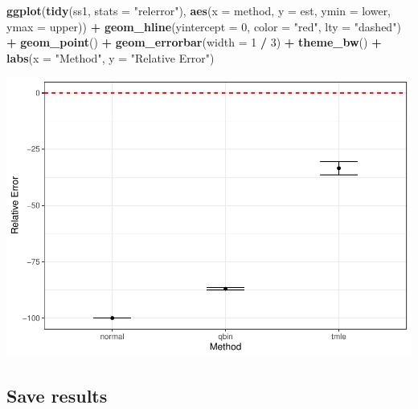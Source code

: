 \documentclass[
]{article}
\newenvironment{Shaded}{\begin{snugshade}}{\end{snugshade}}
\newcommand{\AttributeTok}[1]{\textcolor[rgb]{0.13,0.29,0.53}{#1}}
\newcommand{\DecValTok}[1]{\textcolor[rgb]{0.00,0.00,0.81}{#1}}
\newcommand{\FunctionTok}[1]{\textcolor[rgb]{0.13,0.29,0.53}{\textbf{#1}}}
\newcommand{\NormalTok}[1]{#1}
\newcommand{\SpecialCharTok}[1]{\textcolor[rgb]{0.81,0.36,0.00}{\textbf{#1}}}
\newcommand{\StringTok}[1]{\textcolor[rgb]{0.31,0.60,0.02}{#1}}
\begin{document}
\begin{Shaded}
\begin{Highlighting}[]
\FunctionTok{ggplot}\NormalTok{(}\FunctionTok{tidy}\NormalTok{(ss1, }\AttributeTok{stats =} \StringTok{"relerror"}\NormalTok{), }\FunctionTok{aes}\NormalTok{(}\AttributeTok{x =}\NormalTok{ method, }\AttributeTok{y =}\NormalTok{ est, }\AttributeTok{ymin =}\NormalTok{ lower, }\AttributeTok{ymax =}\NormalTok{ upper)) }\SpecialCharTok{+}
  \FunctionTok{geom\_hline}\NormalTok{(}\AttributeTok{yintercept =} \DecValTok{0}\NormalTok{, }\AttributeTok{color =} \StringTok{"red"}\NormalTok{, }\AttributeTok{lty =} \StringTok{"dashed"}\NormalTok{) }\SpecialCharTok{+}
  \FunctionTok{geom\_point}\NormalTok{() }\SpecialCharTok{+}
  \FunctionTok{geom\_errorbar}\NormalTok{(}\AttributeTok{width =} \DecValTok{1} \SpecialCharTok{/} \DecValTok{3}\NormalTok{) }\SpecialCharTok{+}
  \FunctionTok{theme\_bw}\NormalTok{() }\SpecialCharTok{+}
  \FunctionTok{labs}\NormalTok{(}\AttributeTok{x =} \StringTok{"Method"}\NormalTok{, }\AttributeTok{y =} \StringTok{"Relative Error"}\NormalTok{)}
\end{Highlighting}
\end{Shaded}

\includegraphics{simulation_files/figure-latex/sim-results-4.pdf}

\subsection{Save results}\label{save-results}
\end{document}
